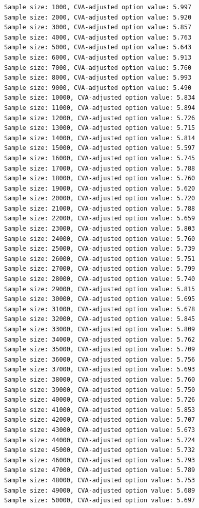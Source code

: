 \documentclass[11pt]{article}
\begin{document}
    \begin{Verbatim}[commandchars=\\\{\}]
Sample size: 1000, CVA-adjusted option value: 5.997
Sample size: 2000, CVA-adjusted option value: 5.920
Sample size: 3000, CVA-adjusted option value: 5.857
Sample size: 4000, CVA-adjusted option value: 5.763
Sample size: 5000, CVA-adjusted option value: 5.643
Sample size: 6000, CVA-adjusted option value: 5.913
Sample size: 7000, CVA-adjusted option value: 5.760
Sample size: 8000, CVA-adjusted option value: 5.993
Sample size: 9000, CVA-adjusted option value: 5.490
Sample size: 10000, CVA-adjusted option value: 5.834
Sample size: 11000, CVA-adjusted option value: 5.894
Sample size: 12000, CVA-adjusted option value: 5.726
Sample size: 13000, CVA-adjusted option value: 5.715
Sample size: 14000, CVA-adjusted option value: 5.814
Sample size: 15000, CVA-adjusted option value: 5.597
Sample size: 16000, CVA-adjusted option value: 5.745
Sample size: 17000, CVA-adjusted option value: 5.788
Sample size: 18000, CVA-adjusted option value: 5.760
Sample size: 19000, CVA-adjusted option value: 5.620
Sample size: 20000, CVA-adjusted option value: 5.720
Sample size: 21000, CVA-adjusted option value: 5.788
Sample size: 22000, CVA-adjusted option value: 5.659
Sample size: 23000, CVA-adjusted option value: 5.803
Sample size: 24000, CVA-adjusted option value: 5.760
Sample size: 25000, CVA-adjusted option value: 5.739
Sample size: 26000, CVA-adjusted option value: 5.751
Sample size: 27000, CVA-adjusted option value: 5.799
Sample size: 28000, CVA-adjusted option value: 5.740
Sample size: 29000, CVA-adjusted option value: 5.815
Sample size: 30000, CVA-adjusted option value: 5.695
Sample size: 31000, CVA-adjusted option value: 5.678
Sample size: 32000, CVA-adjusted option value: 5.845
Sample size: 33000, CVA-adjusted option value: 5.809
Sample size: 34000, CVA-adjusted option value: 5.762
Sample size: 35000, CVA-adjusted option value: 5.709
Sample size: 36000, CVA-adjusted option value: 5.756
Sample size: 37000, CVA-adjusted option value: 5.693
Sample size: 38000, CVA-adjusted option value: 5.760
Sample size: 39000, CVA-adjusted option value: 5.750
Sample size: 40000, CVA-adjusted option value: 5.726
Sample size: 41000, CVA-adjusted option value: 5.853
Sample size: 42000, CVA-adjusted option value: 5.707
Sample size: 43000, CVA-adjusted option value: 5.673
Sample size: 44000, CVA-adjusted option value: 5.724
Sample size: 45000, CVA-adjusted option value: 5.732
Sample size: 46000, CVA-adjusted option value: 5.793
Sample size: 47000, CVA-adjusted option value: 5.789
Sample size: 48000, CVA-adjusted option value: 5.753
Sample size: 49000, CVA-adjusted option value: 5.689
Sample size: 50000, CVA-adjusted option value: 5.697
    \end{Verbatim}
\end{document}
